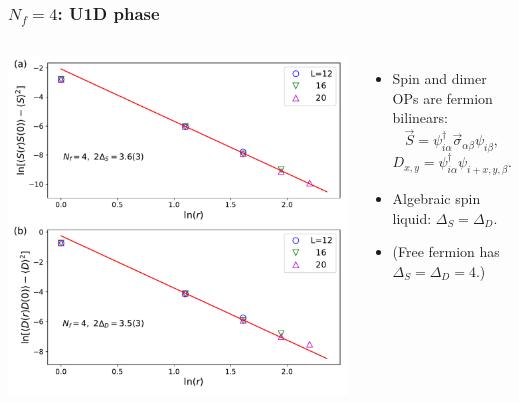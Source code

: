 \documentclass[xcolor=table, 10pt, aspectratio=169]{beamer}
\begin{document}
\begin{frame}
  \frametitle{$N_f=4$: U1D phase}
  \begin{columns}
    \includegraphics[width=\textwidth]{n4decay}
		\begin{itemize}
			\item Spin and dimer OPs are fermion bilinears:
			\[\vec S = \psi^\dagger_{i\alpha}\vec\sigma_{\alpha\beta}\psi_{i\beta},\]
			\[D_{x,y} = \psi^\dagger_{i\alpha}\psi_{i+x,y,\beta}.\]
			\item Algebraic spin liquid: $\Delta_S = \Delta_D$.
		  \item (Free fermion has $\Delta_S=\Delta_D = 4$.)
		\end{itemize}
  \end{columns}
\end{frame}
\end{document}
